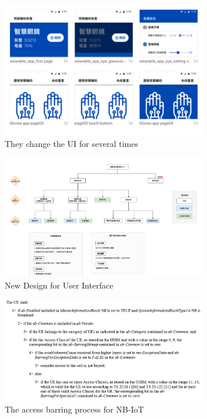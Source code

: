 \documentclass[journal]{IEEEtran}
\begin{document}



	\begin{figure}[t]
    \centering
    \includegraphics[width=3.5in]{figure/layout.png}
    \caption{They change the UI for several times}
    \label{fig_UI_flow}
    \end{figure}
    \begin{figure}[t]
    \centering
    \includegraphics[width=3.5in]{figure/uiflow.png}
    \caption{New Design for User Interface} 
    \label{fig_UI_design}
    \end{figure}
    \begin{figure}[t]
    \centering
    \includegraphics[width=3.5in]{figure/ab.png}
    \caption{The access barring process for NB-IoT}
    \label{fig_Access_Barring}
    \end{figure}



\end{document}
